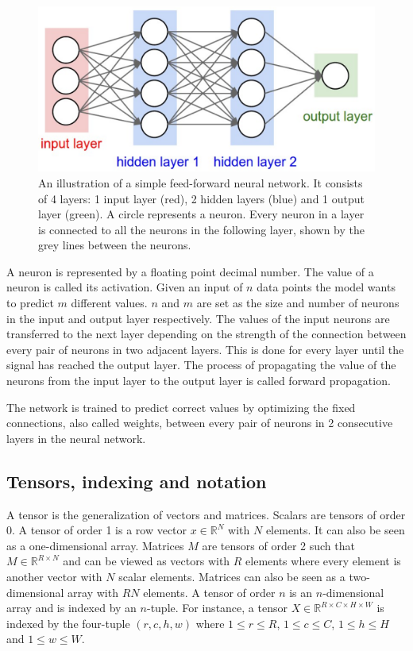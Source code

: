 \documentclass[a4paper, twoside]{article}
\begin{document}
\begin{figure}[h]
	\centering
  		\includegraphics[scale=1]{feedforward.png}
  	\caption{An illustration of a simple feed-forward neural network. It consists of 4 layers: 1 input layer (red), 2 hidden layers (blue) and 1 output layer (green). A circle represents a neuron. Every neuron in a layer is connected to all the neurons in the following layer, shown by the grey lines between the neurons. \cite{hidden12}} \label{figfeedforward}
\end{figure}

A neuron is represented by a floating point decimal number. The value of a neuron is called its activation. Given an input of $n$ data points the model wants to predict $m$ different values. $n$ and $m$ are set as the size and number of neurons in the input and output layer respectively. The values of the input neurons are transferred to the next layer depending on the strength of the connection between every pair of neurons in two adjacent layers. This is done for every layer until the signal has reached the output layer. The process of propagating the value of the neurons from the input layer to the output layer is called forward propagation. \cite{cs231n}

The network is trained to predict correct values by optimizing the fixed connections, also called weights, between every pair of neurons in 2 consecutive layers in the neural network. \cite{cs231n}

\subsection{Tensors, indexing and notation}
A tensor is the generalization of vectors and matrices. Scalars are tensors of order 0. A tensor of order 1 is a row vector $x \in \mathbb{R}^N$ with $N$ elements. It can also be seen as a one-dimensional array. Matrices $M$ are tensors of order 2 such that $M \in \mathbb{R}^{R \times N}$ and can be viewed as vectors with $R$ elements where every element is another vector with $N$ scalar elements. Matrices can also be seen as a two-dimensional array with $RN$ elements. A tensor of order $n$ is an $n$-dimensional array and is indexed by an $n$-tuple. For instance, a tensor $X \in \mathbb{R}^{R \times C \times H \times W}$ is indexed by the four-tuple $(r,c,h,w)$ where $1 \leq r \leq R$, $1 \leq c \leq C$, $1 \leq h \leq H$ and $1 \leq w \leq W$. \cite{cs231n}
\end{document}

